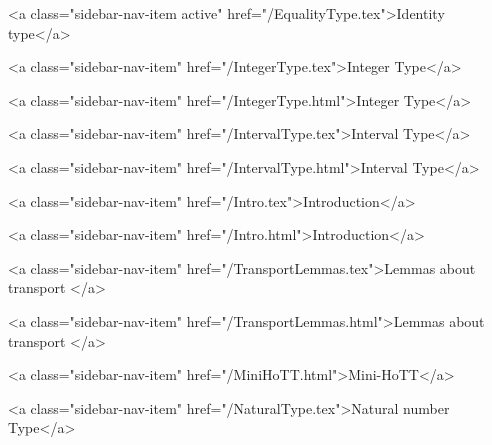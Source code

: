      
        
          <a class="sidebar-nav-item active" href="/EqualityType.tex">Identity type</a>
        
      
    
      
        
          <a class="sidebar-nav-item" href="/IntegerType.tex">Integer Type</a>
        
      
    
      
        
          <a class="sidebar-nav-item" href="/IntegerType.html">Integer Type</a>
        
      
    
      
        
          <a class="sidebar-nav-item" href="/IntervalType.tex">Interval Type</a>
        
      
    
      
        
          <a class="sidebar-nav-item" href="/IntervalType.html">Interval Type</a>
        
      
    
      
        
          <a class="sidebar-nav-item" href="/Intro.tex">Introduction</a>
        
      
    
      
        
          <a class="sidebar-nav-item" href="/Intro.html">Introduction</a>
        
      
    
      
        
          <a class="sidebar-nav-item" href="/TransportLemmas.tex">Lemmas about transport </a>
        
      
    
      
        
          <a class="sidebar-nav-item" href="/TransportLemmas.html">Lemmas about transport </a>
        
      
    
      
        
          <a class="sidebar-nav-item" href="/MiniHoTT.html">Mini-HoTT</a>
        
      
    
      
        
          <a class="sidebar-nav-item" href="/NaturalType.tex">Natural number Type</a>
        
      
    
